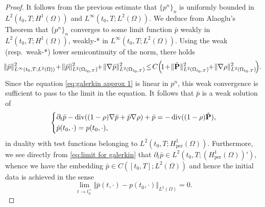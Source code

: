 \documentclass[11pt,a4paper,reqno]{amsart}
\theoremstyle{remark}
\theoremstyle{definition}
\numberwithin{equation}{section}
\newcommand{\per}{\mathrm{per}}
\DeclareMathOperator{\dv}{div}
\renewcommand{\P}{{\bf P}}
\begin{document}
\begin{proof}
It follows from the previous estimate that $\{p^n \}_n$ is uniformly bounded in $L^2(t_0,T;H^1(\Omega))$ and $L^\infty(t_0,T;L^2(\Omega))$. We deduce from Alaoglu's Theorem that $\{p^n\}_n$ converges to some limit function $\bar{p}$ weakly in $L^2(t_0,T;H^1(\Omega))$, weakly-* in $L^\infty(t_0,T;L^2(\Omega))$. Using the weak (resp.~weak-*) lower semicontinuity of the norm, there holds 
\begin{equation}\label{eq:H1 est pi}
   \begin{aligned}
       \!\! \Vert \bar{p} \Vert_{L^\infty(t_0,T;L^2(\Omega))}^2 \! +\! \Vert \bar{p} \Vert^2_{L^2(\Omega_{t_0,T})} \!\!+\!\Vert \nabla \bar{p} \Vert^2_{L^2(\Omega_{t_0,T})} \! \leq \! C \Big( \!1\! +\! \Vert \tilde{\P} \Vert^2_{L^2(\Omega_{t_0,T})} \!\!+\! \Vert \nabla \rho \Vert^2_{L^2(\Omega_{t_0,T})} \! \Big). 
   \end{aligned}
\end{equation}
Since the equation \eqref{eq:galerkin approx 1} is linear in $p^n$, this weak convergence is sufficient to pass to the limit in the equation. It follows that $\bar{p}$ is a weak solution of 
\begin{equation}\label{eq:limit for galerkin}
    \left\lbrace\begin{aligned}
        & \partial_t \bar{p} - \dv((1-\rho)\nabla \bar{p} + \bar{p} \nabla \rho) +\bar{p} = - \dv((1-\rho)\tilde{\P}) , \\ 
        & \bar{p}(t_0,\cdot) = p(t_0,\cdot), 
    \end{aligned}\right.
\end{equation}
in duality with test functions belonging to $L^2(t_0,T;H^1_\per(\Omega))$. Furthermore, we see directly from \eqref{eq:limit for galerkin} that $\partial_t \bar{p} \in L^2(t_0,T;(H^1_\per(\Omega))')$, whence we have the embedding $\bar{p} \in C([t_0,T];L^2(\Omega))$ and hence the initial data is achieved in the sense 
\begin{equation}\label{eq:L2 conv pi to p}
    \lim_{t \to t_0^+} \Vert \bar{p}(t,\cdot) - p(t_0,\cdot) \Vert_{L^2(\Omega)} = 0. 
\end{equation}



\smallskip 


\end{proof}
\end{document}
